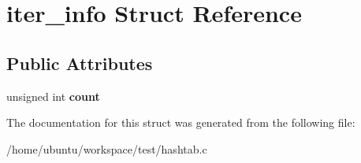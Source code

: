 \hypertarget{structiter__info}{\section{iter\-\_\-info Struct Reference}
\label{structiter__info}
}
\subsection*{Public Attributes}
\begin{DoxyCompactItemize}
\item 
\hypertarget{structiter__info_a292b8cde85815cfd23d4a0a9db4e62dd}{unsigned int {\bfseries count}}\label{structiter__info_a292b8cde85815cfd23d4a0a9db4e62dd}

\end{DoxyCompactItemize}


The documentation for this struct was generated from the following file\-:\begin{DoxyCompactItemize}
\item 
/home/ubuntu/workspace/test/hashtab.\-c\end{DoxyCompactItemize}
